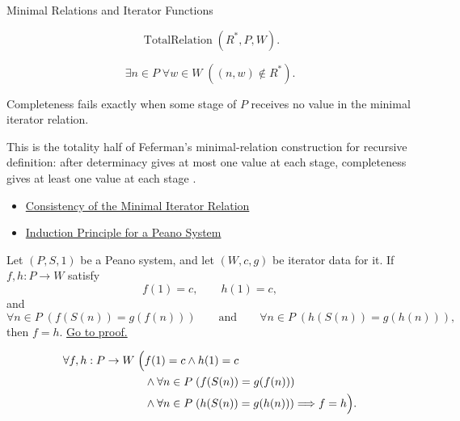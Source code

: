 \begin{topicbox}{Minimal Relations and Iterator Functions}
\begin{remark*}
\[
\operatorname{TotalRelation}(R^*,P,W).
\]
\end{remark*}

\begin{remark*}
\[
\exists n\in P\;\forall w\in W\;((n,w)\notin R^*).
\]
\end{remark*}

\begin{remark*}
Completeness fails exactly when some stage of $P$ receives no value in the
minimal iterator relation.
\end{remark*}

\begin{remark*}
This is the totality half of Feferman's minimal-relation construction for
recursive definition: after determinacy gives at most one value at each stage,
completeness gives at least one value at each stage
\citep{FefermanNumberSystems1964}.
\end{remark*}

\begin{dependencies}
\begin{itemize}
  \item \hyperref[lem:iterator-relation-consistency]{Consistency of the Minimal Iterator Relation}
  \item \hyperref[thm:induction-principle-for-peano-system]{Induction Principle for a Peano System}
\end{itemize}
\end{dependencies}

\begin{tcolorbox}[colback=lembox, colframe=lemborder, arc=2pt,
  left=6pt, right=6pt, top=4pt, bottom=4pt,
  title={\small\textbf{Lemma (Uniqueness of Iterator Functions)}},
  fonttitle=\small\bfseries]
\begin{lemma}
\label{lem:uniqueness-of-iterator-functions}
Let $(P,S,1)$ be a Peano system, and let $(W,c,g)$ be iterator data for it. If
$f,h:P\to W$ satisfy
\[
f(1)=c,\qquad h(1)=c,
\]
and
\[
\forall n\in P\;(f(S(n))=g(f(n)))
\qquad\text{and}\qquad
\forall n\in P\;(h(S(n))=g(h(n))),
\]
then $f=h$.
\hyperref[prf:uniqueness-of-iterator-functions]{Go to proof.}
\end{lemma}
\end{tcolorbox}

\begin{remark*}
\[
\begin{aligned}
\forall f,h:P\to W\;\Bigl(&
f(1)=c\land h(1)=c\\
&\land \forall n\in P\;(f(S(n))=g(f(n)))\\
&\land \forall n\in P\;(h(S(n))=g(h(n)))
\Longrightarrow f=h\Bigr).
\end{aligned}
\]
\end{remark*}


\end{topicbox}
